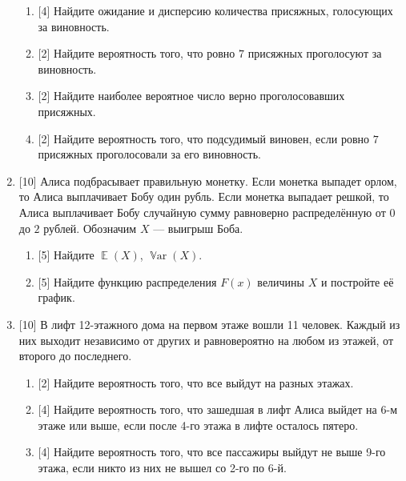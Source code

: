 \documentclass[12pt]{article}
\DeclareMathOperator{\Var}{\mathbb{V}ar}
\DeclareMathOperator{\E}{\mathbb{E}}
\begin{document}
\begin{enumerate}
    \begin{enumerate}
        \item {[4]} Найдите ожидание и дисперсию количества присяжных, голосующих за виновность. 
        \item {[2]} Найдите вероятность того, что ровно $7$ присяжных проголосуют за виновность. 
        \item {[2]} Найдите наиболее вероятное число верно проголосовавших присяжных.
        \item {[2]} Найдите вероятность того, что подсудимый виновен, если ровно $7$ присяжных проголосовали за его виновность. 
    \end{enumerate}
    \item {[10]} Алиса подбрасывает правильную монетку. Если монетка выпадет орлом, то Алиса выплачивает Бобу один рубль. 
    Если монетка выпадает решкой, то Алиса выплачивает Бобу случайную сумму равноверно распределённую от $0$ до $2$ рублей. 
    Обозначим $X$ — выигрыш Боба.
    \begin{enumerate}
        \item {[5]} Найдите $\E(X)$, $\Var(X)$.
        \item {[5]} Найдите функцию распределения $F(x)$ величины $X$ и постройте её график.
    \end{enumerate}
    \item {[10]} В лифт 12-этажного дома на первом этаже вошли 11 человек. 
    Каждый из них выходит независимо от других и равновероятно на любом из этажей, от второго до последнего. 
    \begin{enumerate}
        \item {[2]} Найдите вероятность того, что все выйдут на разных этажах.
        \item {[4]} Найдите вероятность того, что зашедшая в лифт Алиса выйдет на 6-м этаже или выше, если после 4-го этажа в лифте осталось пятеро.
        \item {[4]} Найдите вероятность того, что все пассажиры выйдут не выше 9-го этажа, если никто из них не вышел со 2-го по 6-й.
    \end{enumerate}
\end{enumerate}
\end{document}
